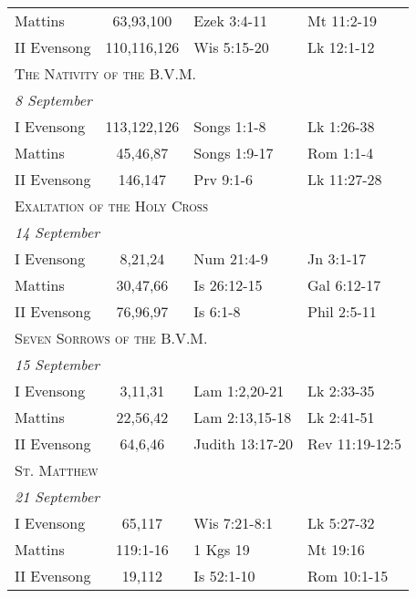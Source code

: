 \begin{longtable}{l c l l}
\hspace{1em} Mattins&63,93,100&Ezek 3:4-11&Mt 11:2-19\\
\hspace{1em} II Evensong&110,116,126&Wis 5:15-20&Lk 12:1-12\\
%
\multicolumn{4}{l}{\textsc{The Nativity of the B.V.M.}}\\
\multicolumn{4}{l}{\textit{8 September}}\\
\hspace{1em} I Evensong&113,122,126&Songs 1:1-8&Lk 1:26-38\\
\hspace{1em} Mattins&45,46,87&Songs 1:9-17&Rom 1:1-4\\
\hspace{1em} II Evensong&146,147&Prv 9:1-6&Lk 11:27-28\\
%
\multicolumn{4}{l}{\textsc{Exaltation of the Holy Cross}}\\
\multicolumn{4}{l}{\textit{14 September}}\\
\hspace{1em} I Evensong&8,21,24&Num 21:4-9&Jn 3:1-17\\
\hspace{1em} Mattins&30,47,66&Is 26:12-15&Gal 6:12-17\\
\hspace{1em} II Evensong&76,96,97&Is 6:1-8&Phil 2:5-11\\
%
\multicolumn{4}{l}{\textsc{Seven Sorrows of the B.V.M.}}\\
\multicolumn{4}{l}{\textit{15 September}}\\
\hspace{1em} I Evensong&3,11,31&Lam 1:2,20-21&Lk 2:33-35\\
\hspace{1em} Mattins&22,56,42&Lam 2:13,15-18&Lk 2:41-51\\
\hspace{1em} II Evensong&64,6,46&Judith 13:17-20&Rev 11:19-12:5\\
\multicolumn{4}{l}{\textsc{St. Matthew}}\\
\multicolumn{4}{l}{\textit{21 September}}\\
\hspace{1em} I Evensong&65,117&Wis 7:21-8:1&Lk 5:27-32\\
\hspace{1em} Mattins&119:1-16&1 Kgs 19&Mt 19:16\\
\hspace{1em} II Evensong&19,112&Is 52:1-10&Rom 10:1-15\\

\end{longtable}
